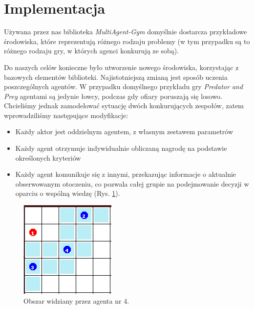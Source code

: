 \section{Implementacja}
Używana przez nas biblioteka \textit{MultiAgent-Gym} domyślnie dostarcza przykładowe
środowiska, które reprezentują różnego rodzaju problemy (w tym przypadku są to różnego
rodzaju gry, w których agenci konkurują ze sobą).

Do naszych celów konieczne było utworzenie nowego środowiska, korzystając z bazowych elementów biblioteki.
Najistotniejszą zmianą jest sposób uczenia poszczególnych agentów. W przypadku domyślnego
przykładu gry \textit{Predator and Prey} agentami są jedynie łowcy, podczas gdy ofiary poruszają
się losowo. Chcieliśmy jednak zamodelować sytuację dwóch konkurujących zespołów, zatem wprowadziliśmy
następujące modyfikacje:
\begin{itemize}
    \item Każdy aktor jest oddzielnym agentem, z własnym zestawem parametrów
    \item Każdy agent otrzymuje indywidualnie obliczaną nagrodę na podstawie określonych kryteriów
    \item Każdy agent komunikuje się z innymi, przekazując informacje o aktualnie obserwowanym otoczeniu,
          co pozwala całej grupie na podejmowanie decyzji w oparciu o wspólną wiedzę (Rys. \ref{fig:agent_view}).
\end{itemize}
\begin{figure}[H]
  \includegraphics[width=\linewidth]{images/agent_view.png}
  \caption{Obszar widziany przez agenta nr 4.}
  \label{fig:agent_view}
\end{figure}


